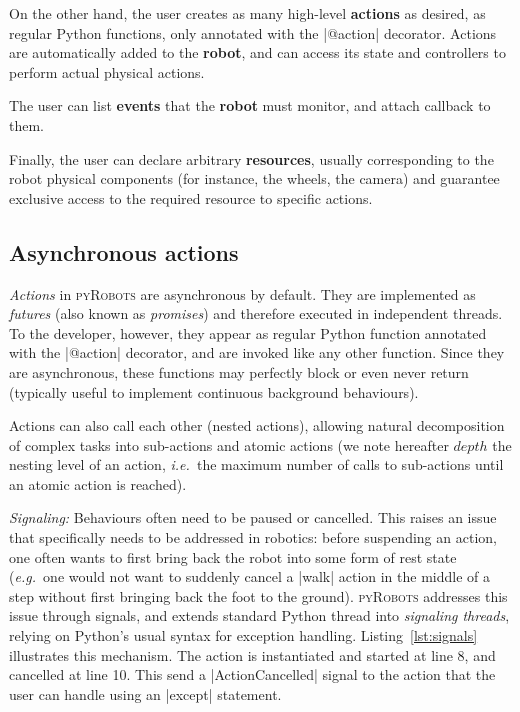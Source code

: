 \documentclass[a4paper, 10pt, conference]{ieeeconf}      %
\newcommand{\ie}{{\textit{i.e.\ }}}
\newcommand{\eg}{{\textit{e.g.\ }}}
\newcommand{\pyRobots}{\textsc{pyRobots}}
\begin{document}
On the other hand, the user creates as many high-level \textbf{actions} as
desired, as regular Python functions, only annotated with the \python|@action|
decorator. Actions are automatically added to the \textbf{robot}, and can access
its state and controllers to perform actual physical actions.

The user can list \textbf{events} that the \textbf{robot} must monitor, and
attach callback to them.

Finally, the user can declare arbitrary \textbf{resources}, usually
corresponding to the robot physical components (for instance, the wheels, the
camera) and guarantee exclusive access to the required resource to specific
actions.

\subsection{Asynchronous actions}

\emph{Actions} in \pyRobots{} are asynchronous by default. They are implemented as
\emph{futures} (also known as \emph{promises}) and therefore executed in
independent threads. To the developer, however, they appear as regular Python
function annotated with the \python|@action| decorator, and are invoked
like any other function.  Since they are asynchronous, these functions may
perfectly block or even never return (typically useful to implement continuous
background behaviours).

Actions can also call each other (nested actions), allowing natural
decomposition of complex tasks into sub-actions and atomic actions (we note
hereafter $depth$ the nesting level of an action, \ie the maximum number of
calls to sub-actions until an atomic action is reached).

\emph{Signaling:} Behaviours often need to be paused or cancelled.  This raises
an issue that specifically needs to be addressed in robotics: before suspending
an action, one often wants to first bring back the robot into some form of rest
state (\eg one would not want to suddenly cancel a \python|walk| action in the
middle of a step without first bringing back the foot to the ground). \pyRobots{}
addresses this issue through signals, and extends standard Python thread into
\emph{signaling threads}, relying on Python's usual syntax for exception
handling. Listing~\ref{lst:signals} illustrates this mechanism. The action is
instantiated and started at line 8, and cancelled at line 10. This send a
\python|ActionCancelled| signal to the action that the user can handle using an
\python|except| statement.
\end{document}
